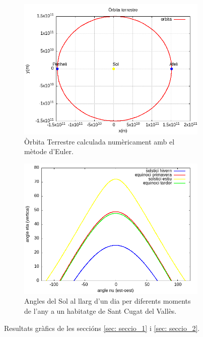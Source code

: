 \documentclass[11pt]{article}
\begin{document}
\begin{figure}[H]
    \centering
    \begin{subfigure}{0.4\textwidth}
        \centering
        \includegraphics[width=\textwidth]{orbita.png}
        \caption{Òrbita Terrestre calculada numèricament amb el mètode d'Euler.}
        \label{fig: orb_terra}
    \end{subfigure}
    \hspace{0.1\textwidth}
    \begin{subfigure}{0.4\textwidth}
        \centering
        \includegraphics[width=\textwidth]{equinocis.png}
        \caption{Angles del Sol al llarg d'un dia per diferents moments de l'any a un habitatge de Sant Cugat del Vallès.}
        \label{fig: solsticis}
    \end{subfigure}
\caption{Resultats gràfics de les seccións \ref{sec: seccio_1} i \ref{sec: seccio_2}.}
\end{figure}
\end{document}
